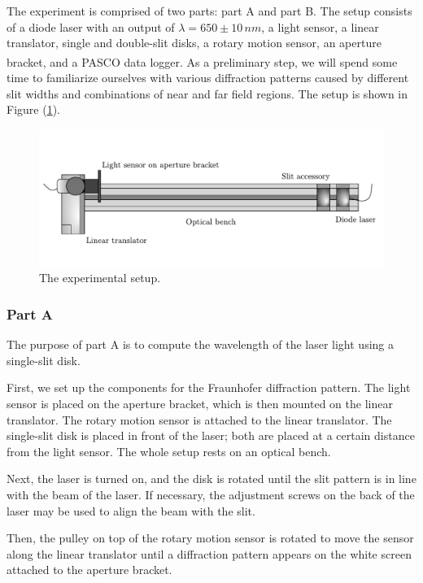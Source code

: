 \documentclass[10pt]{article}
\begin{document}
The experiment is comprised of two parts: part A and part B. The setup consists of a diode laser with an output of $\lambda = 650 \pm 10\,\unit{nm}$, a light sensor, a linear translator, single and double-slit disks, a rotary motion sensor, an aperture bracket, and a PASCO{\textsuperscript\textregistered} data logger. As a preliminary step, we will spend some time to familiarize ourselves with various diffraction patterns caused by different slit widths and combinations of near and far field regions. The setup is shown in Figure (\ref{fig:1}).

\begin{figure}[ht]
  \centering
  \includegraphics[scale=0.6]{figures/f1.pdf}
  \caption{The experimental setup.}
  \label{fig:1}
\end{figure}

\subsubsection*{Part A}

The purpose of part A is to compute the wavelength of the laser light using a single-slit disk.

First, we set up the components for the Fraunhofer diffraction pattern. The light sensor is placed on the aperture bracket, which is then mounted on the linear translator. The rotary motion sensor is attached to the linear translator. The single-slit disk is placed in front of the laser; both are placed at a certain distance from the light sensor. The whole setup rests on an optical bench.

Next, the laser is turned on, and the disk is rotated until the slit pattern is in line with the beam of the laser. If necessary, the adjustment screws on the back of the laser may be used to align the beam with the slit. 

Then, the pulley on top of the rotary motion sensor is rotated to move the sensor along the linear translator until a diffraction pattern appears on the white screen attached to the aperture bracket. 
\end{document}
